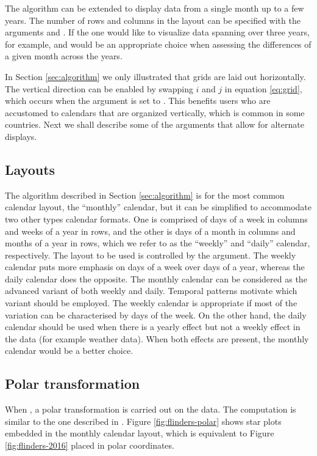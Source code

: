 \documentclass[article]{jss}
\theoremstyle{definition}
\theoremstyle{definition}
\theoremstyle{remark}
\begin{document}
The algorithm can be extended to display data from a single month up to
a few years. The number of rows and columns in the layout can be
specified with the arguments  and . If the one
would like to visualize data spanning over three years, for example,
 and  would be an appropriate choice when
assessing the differences of a given month across the years.

In Section \ref{sec:algorithm} we only illustrated that grids are laid
out horizontally. The vertical direction can be enabled by swapping
\(i\) and \(j\) in equation \eqref{eq:grid}, which occurs when the
argument  is set to . This benefits users who are
accustomed to calendars that are organized vertically, which is common
in some countries. Next we shall describe some of the arguments that
allow for alternate displays.

\subsection{Layouts}\label{layouts}

The algorithm described in Section \ref{sec:algorithm} is for the most
common calendar layout, the ``monthly'' calendar, but it can be
simplified to accommodate two other types calendar formats. One is
comprised of days of a week in columns and weeks of a year in rows, and
the other is days of a month in columns and months of a year in rows,
which we refer to as the ``weekly'' and ``daily'' calendar,
respectively. The layout to be used is controlled by the 
argument. The weekly calendar puts more emphasis on days of a week over
days of a year, whereas the daily calendar does the opposite. The
monthly calendar can be considered as the advanced variant of both
weekly and daily. Temporal patterns motivate which variant should be
employed. The weekly calendar is appropriate if most of the variation
can be characterised by days of the week. On the other hand, the daily
calendar should be used when there is a yearly effect but not a weekly
effect in the data (for example weather data). When both effects are
present, the monthly calendar would be a better choice.

\subsection{Polar transformation}\label{polar-transformation}

When , a polar transformation is carried out on the
data. The computation is similar to the one described in
\citet{Wickham2012glyph}. Figure \ref{fig:flinders-polar} shows star
plots embedded in the monthly calendar layout, which is equivalent to
Figure \ref{fig:flinders-2016} placed in polar coordinates.
\end{document}
